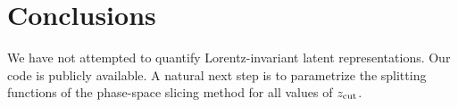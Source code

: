 \section{Conclusions}\label{sec:conclusions}

We have not attempted to quantify Lorentz-invariant latent
representations. Our code is publicly available. A natural next step is
to parametrize the splitting functions of the phase-space slicing method
for all values of $z_{\rm cut}$.

